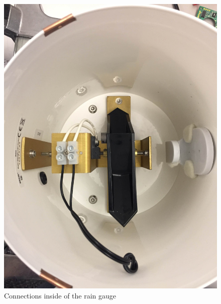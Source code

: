 \begin{figure}[!htb]
  \includegraphics[width=\linewidth]{in.png}
  \caption{Connections inside of the rain gauge}
  \label{fig:gauge_in}
\endminipage\hfill
{}

\end{figure}

